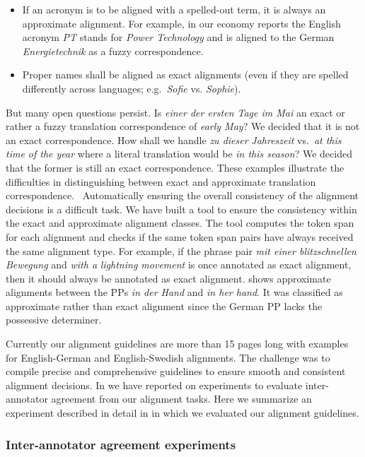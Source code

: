 \documentclass[output=paper]{LSP/langsci}
\begin{document}
\begin{itemize}
\item 
If an acronym is to be aligned with a spelled-out term, it is always an approximate alignment. For example, in our economy reports the English acronym \textit{PT} stands for \textit{Power Technology} and is aligned to the German \textit{Energietechnik} as a fuzzy correspondence. 
\item  
Proper names shall be aligned as exact alignments (even if they are spelled differently across languages; e.g.~\textit{Sofie} vs. \textit{Sophie}).
\end{itemize} 

But many open questions persist. Is \textit{einer der ersten Tage im Mai }an exact or rather a fuzzy translation correspondence of \textit{early May}? We decided that it is not an exact correspondence. How shall we handle \textit{zu dieser} \textit{Jahreszeit} vs.~\textit{at this time of the year }where a literal translation would be \textit{in this season}? We decided that the former is still an exact correspondence. These examples illustrate the difficulties in distinguishing between exact and approximate translation correspondence. 
\
Automatically ensuring the overall consistency of the alignment decisions is a difficult task. We have built a tool to ensure the consistency within the exact and approximate alignment classes. The tool computes the token span for each alignment and checks if the same token span pairs have always received the same alignment type. For example, if the phrase pair \textit{mit einer blitzschnellen Bewegung} and \textit{with a} \textit{lightning movement} is once annotated as exact alignment, then it should always be annotated as exact alignment.  shows approximate alignments between the PPs \textit{in der Hand }and \textit{in her hand}. It was classified as approximate rather than exact alignment since the German PP lacks the possessive determiner. 

Currently our alignment guidelines are more than 15 pages long with examples for English-German and English-Swedish alignments. The challenge was to compile precise and comprehensive guidelines to ensure smooth and consistent alignment decisions. In \citet{Samuelsson2006} we have reported on experiments to evaluate inter-annotator agreement from our alignment tasks. Here we summarize an experiment described in detail in \citet{Volk2008} in which we evaluated our alignment guidelines. 

\subsubsection{Inter-annotator agreement experiments}\label{sec:volk:2.2.3}
\end{document}
